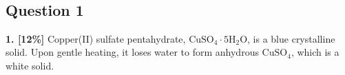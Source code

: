 \documentclass[10pt,a4paper]{article}
\begin{document}
\begin{center}
    \large{} \\
    \vspace{0.2cm}
    \normalsize{}
\end{center}

\vspace{0.5cm}

\subsection*{Question 1}
\textbf{1. [12\%]} Copper(II) sulfate pentahydrate, $\text{CuSO}_4\cdot5\text{H}_2\text{O}$, is a blue crystalline solid. Upon gentle heating, it loses water to form anhydrous $\text{CuSO}_4$, which is a white solid.
\end{document}
